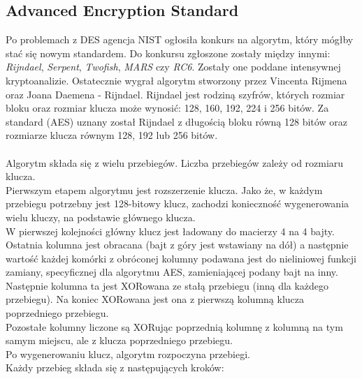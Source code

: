 \subsection{Advanced Encryption Standard}
Po problemach z DES agencja NIST ogłosiła konkurs na algorytm, który mógłby stać się nowym standardem.
Do konkursu zgłoszone zostały między innymi: \textit{Rijndael}, \textit{Serpent}, \textit{Twofish}, \textit{MARS} czy \textit{RC6}. 
Zostały one poddane intensywnej kryptoanalizie. 
Ostatecznie wygrał algorytm stworzony przez Vincenta Rijmena oraz Joana Daemena - Rijndael. 
Rijndael jest rodziną szyfrów, których rozmiar bloku oraz rozmiar klucza może wynosić: 128, 160, 192, 224 i 256 bitów. 
Za standard (AES) uznany został Rijndael z długością bloku równą 128 bitów oraz rozmiarze klucza równym 128, 192 lub 256 bitów. \\ \\
Algorytm składa się z wielu przebiegów. Liczba przebiegów zależy od rozmiaru klucza. \\
Pierwszym etapem algorytmu jest rozszerzenie klucza. 
Jako że, w każdym przebiegu potrzebny jest 128-bitowy klucz, zachodzi konieczność wygenerowania wielu kluczy, 
na podstawie głównego klucza. \\
W pierwszej kolejności główny klucz jest ładowany do macierzy 4 na 4 bajty. 
Ostatnia kolumna jest obracana (bajt z góry jest wstawiany na dół) a następnie 
wartość każdej komórki z obróconej kolumny podawana jest do nieliniowej funkcji zamiany, 
specyficznej dla algorytmu AES, zamieniającej podany bajt na inny.
Następnie kolumna ta jest XORowana ze stałą przebiegu (inną dla każdego przebiegu). 
Na koniec XORowana jest ona z pierwszą kolumną klucza poprzedniego przebiegu. \\
Pozostałe kolumny liczone są XORując poprzednią kolumnę z kolumną na tym samym miejscu, ale z klucza poprzedniego przebiegu. \\ 
Po wygenerowaniu klucz, algorytm rozpoczyna przebiegi. \\
Każdy przebieg składa się z następujących kroków:
